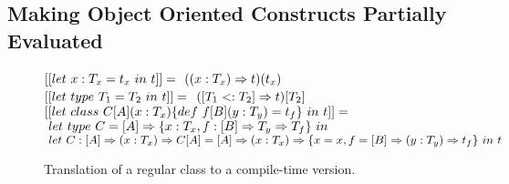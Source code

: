 \subsection{Making Object Oriented Constructs Partially Evaluated}
\label{sct:promotion}

\begin{figure}
  $ [[ let\ x: T_x = t_x\ in\ t ]] = \\ $
  $ ((x: T_x) \Rightarrow t)(t_x) \\ \\$
  $ [[ let\ type\ T_1 = T_2\ in\ t ]] = \\ $
  $ ([T_1 <: T_2] \Rightarrow t)[T_2] \\ \\ $
  $ [[ let\ class\ C[A](x: T_x) \{ def\ f[B](y: T_y) = t_f \}\ in\ t ]] = \\ $
  $ \ let\ type\  C = [A] \Rightarrow \{ x: T_x, f: [B] \Rightarrow T_y \Rightarrow T_f \}\ in \\ $
  $ \ let\ C: [A] \Rightarrow (x: T_x) \Rightarrow C[A] = [A] \Rightarrow (x: T_x) \Rightarrow \{ x = x, f = [B] \Rightarrow (y: T_y) \Rightarrow t_f \}\ in\ t$
\end{figure}

\begin{figure}
\begin{multicols}{2}[]

    {\Pi \ts {}}

    {\Pi \ts {}}

\end{multicols}
\vspace{4pt}

    {\Pi \ts {}}

    {\Pi \ts {}}

    {\Pi \ts {}}

    {\Pi \ts {}}

    {\Pi \ts {}}

    {\Pi \ts {}}

    {\Pi \ts {}}

\caption{Translation of a regular class to a compile-time version.}
\label{fig:partial-evaluation}
\end{figure}
